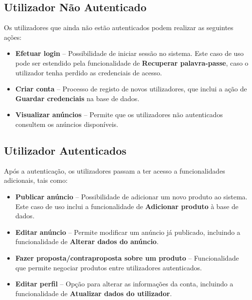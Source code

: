 \documentclass[a4paper, 12pt]{article} %
\begin{document}
\subsection{Utilizador Não Autenticado}
Os utilizadores que ainda não estão autenticados podem realizar as seguintes ações:
\begin{itemize}
	\item \textbf{Efetuar login} – Possibilidade de iniciar sessão no sistema. Este caso de uso pode ser estendido pela funcionalidade de \textbf{Recuperar palavra-passe}, caso o utilizador tenha perdido as credenciais de acesso.
	\item \textbf{Criar conta} – Processo de registo de novos utilizadores, que inclui a ação de \textbf{Guardar credenciais} na base de dados.
	\item \textbf{Visualizar anúncios} – Permite que os utilizadores não autenticados consultem os anúncios disponíveis.
\end{itemize}

\subsection{Utilizador Autenticados}
Após a autenticação, os utilizadores passam a ter acesso a funcionalidades adicionais, tais como:
\begin{itemize}
	\item \textbf{Publicar anúncio} – Possibilidade de adicionar um novo produto ao sistema. Este caso de uso inclui a funcionalidade de \textbf{Adicionar produto} à base de dados.
	\item \textbf{Editar anúncio} – Permite modificar um anúncio já publicado, incluindo a funcionalidade de \textbf{Alterar dados do anúncio}.
	\item \textbf{Fazer proposta/contraproposta sobre um produto} – Funcionalidade que permite negociar produtos entre utilizadores autenticados.
	\item \textbf{Editar perfil} – Opção para alterar as informações da conta, incluindo a funcionalidade de \textbf{Atualizar dados do utilizador}.
\end{itemize}
\end{document}
